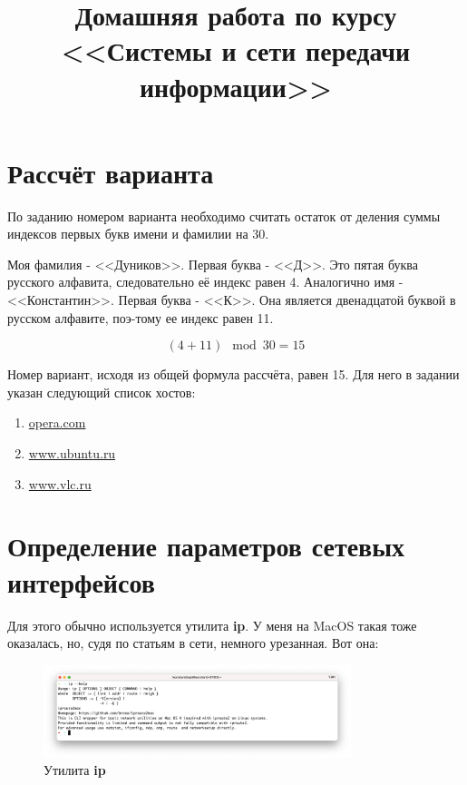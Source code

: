 \documentclass[a4paper]{article}
\title{
  Домашняя работа по курсу \\
  <<Системы и сети передачи информации>>  
}
\begin{document}
  \templatedtitlepage
  \toc

  \section{Рассчёт варианта}
  По заданию номером варианта необходимо считать остаток от деления суммы индексов первых букв
  имени и фамилии на 30.

  Моя фамилия - <<Дуников>>. Первая буква - <<Д>>. Это пятая буква русского алфавита, следовательно её индекс равен 4.
  Аналогично имя - <<Константин>>. Первая буква - <<К>>. Она является двенадцатой буквой в русском алфавите,
  поэ-тому ее индекс равен 11.

  \begin{equation}
    (4 + 11) \mod 30 = 15
  \end{equation}

  Номер вариант, исходя из общей формула рассчёта, равен 15. Для него в задании указан следующий список хостов:
  \begin{enumerate}
    \item \href{opera.com}{opera.com}
    \item \href{www.ubuntu.ru}{www.ubuntu.ru}
    \item \href{www.vlc.ru}{www.vlc.ru}
  \end{enumerate}

  \newpage
  \section{Определение параметров сетевых интерфейсов}

  Для этого обычно используется утилита \textbf{ip}. У меня на MacOS такая тоже оказалась, но,
  судя по статьям в сети, немного урезанная. Вот она:
  \begin{figure}[H]
    \centering
    \includegraphics[width=0.8\textwidth]{s21}
    \caption{Утилита \textbf{ip}}
  \end{figure}
\end{document}
